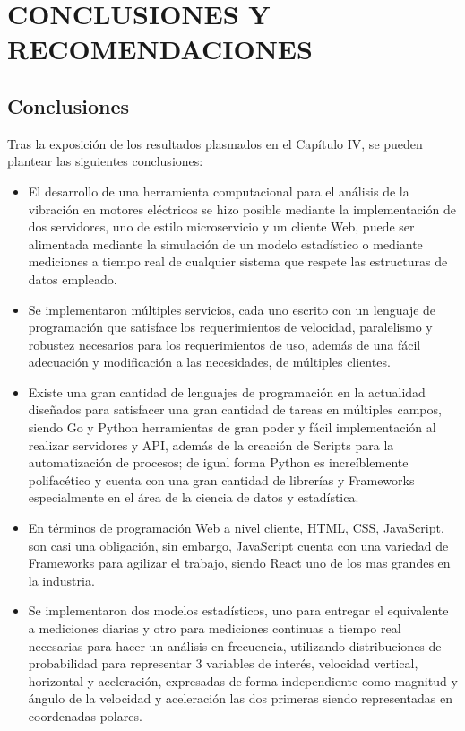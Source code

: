 \thispagestyle{empty}

\section*{CONCLUSIONES Y RECOMENDACIONES}
\subsection{Conclusiones}
Tras la exposición de los resultados plasmados en el Capítulo IV, se pueden
plantear las siguientes conclusiones:

\begin{itemize}
    \item El desarrollo  de una herramienta computacional para el análisis de
        la vibración en motores eléctricos se hizo posible mediante la
        implementación de dos servidores, uno de estilo
        microservicio y un cliente Web, puede ser alimentada mediante la
        simulación de un  modelo estadístico o
        mediante mediciones a tiempo real de cualquier sistema
        que respete las estructuras de datos empleado.
    \item Se implementaron múltiples servicios, cada uno escrito con un
        lenguaje de programación que satisface los requerimientos de velocidad,
        paralelismo y robustez necesarios para  los requerimientos de
        uso, además de una fácil adecuación y modificación a las necesidades,
        de múltiples clientes.
    \item Existe una gran cantidad de lenguajes de programación en la actualidad
        diseñados para satisfacer una gran cantidad de tareas en múltiples campos,
        siendo Go y Python herramientas de gran poder y fácil implementación
        al realizar servidores y API, además de la creación de Scripts
        para la automatización de procesos; de igual forma Python es increíblemente
        polifacético y cuenta con una gran cantidad de librerías y Frameworks
        especialmente en el área de la ciencia de datos y estadística.
    \item En términos de programación Web a nivel cliente,
        HTML, CSS, JavaScript, son casi una obligación, sin embargo,
        JavaScript cuenta con una  variedad de Frameworks para agilizar el
        trabajo, siendo React uno
        de los mas grandes en la industria.
    \item Se implementaron dos modelos estadísticos, uno para entregar el
        equivalente a mediciones diarias y otro para mediciones continuas a tiempo
        real necesarias para hacer un análisis en frecuencia,
        utilizando distribuciones de probabilidad para representar 3 variables de interés,
        velocidad vertical, horizontal y aceleración, expresadas de forma independiente
        como magnitud y ángulo de la velocidad y aceleración las dos primeras
        siendo representadas en coordenadas polares.


\end{itemize}
